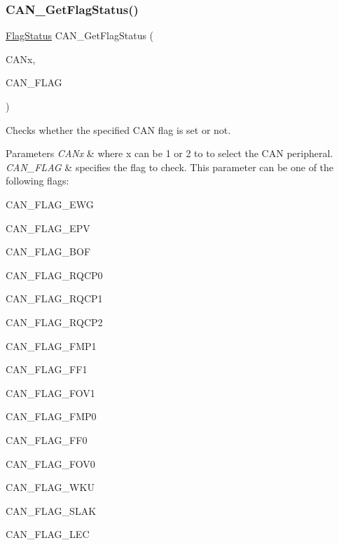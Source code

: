 \subsubsection{\texorpdfstring{C\+A\+N\+\_\+\+Get\+Flag\+Status()}{CAN\_GetFlagStatus()}}
{\footnotesize\ttfamily \hyperlink{group___exported__types_ga89136caac2e14c55151f527ac02daaff}{Flag\+Status} C\+A\+N\+\_\+\+Get\+Flag\+Status (\begin{DoxyParamCaption}\item[{\hyperlink{struct_c_a_n___type_def}{C\+A\+N\+\_\+\+Type\+Def} $\ast$}]{C\+A\+Nx,  }\item[{uint32\+\_\+t}]{C\+A\+N\+\_\+\+F\+L\+AG }\end{DoxyParamCaption})}



Checks whether the specified C\+AN flag is set or not. 


\begin{DoxyParams}{Parameters}
{\em C\+A\+Nx} & where x can be 1 or 2 to to select the C\+AN peripheral. \\
\hline
{\em C\+A\+N\+\_\+\+F\+L\+AG} & specifies the flag to check. This parameter can be one of the following flags\+:
\begin{DoxyItemize}
\item C\+A\+N\+\_\+\+F\+L\+A\+G\+\_\+\+E\+WG
\item C\+A\+N\+\_\+\+F\+L\+A\+G\+\_\+\+E\+PV
\item C\+A\+N\+\_\+\+F\+L\+A\+G\+\_\+\+B\+OF
\item C\+A\+N\+\_\+\+F\+L\+A\+G\+\_\+\+R\+Q\+C\+P0
\item C\+A\+N\+\_\+\+F\+L\+A\+G\+\_\+\+R\+Q\+C\+P1
\item C\+A\+N\+\_\+\+F\+L\+A\+G\+\_\+\+R\+Q\+C\+P2
\item C\+A\+N\+\_\+\+F\+L\+A\+G\+\_\+\+F\+M\+P1
\item C\+A\+N\+\_\+\+F\+L\+A\+G\+\_\+\+F\+F1
\item C\+A\+N\+\_\+\+F\+L\+A\+G\+\_\+\+F\+O\+V1
\item C\+A\+N\+\_\+\+F\+L\+A\+G\+\_\+\+F\+M\+P0
\item C\+A\+N\+\_\+\+F\+L\+A\+G\+\_\+\+F\+F0
\item C\+A\+N\+\_\+\+F\+L\+A\+G\+\_\+\+F\+O\+V0
\item C\+A\+N\+\_\+\+F\+L\+A\+G\+\_\+\+W\+KU
\item C\+A\+N\+\_\+\+F\+L\+A\+G\+\_\+\+S\+L\+AK
\item C\+A\+N\+\_\+\+F\+L\+A\+G\+\_\+\+L\+EC 
\end{DoxyItemize}\\
\hline
\end{DoxyParams}

